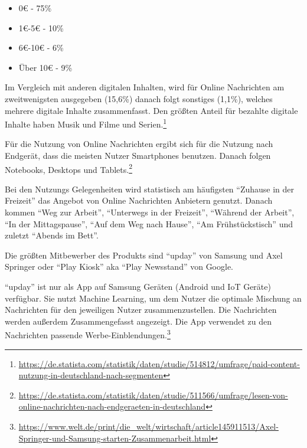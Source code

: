 \begin{itemize}
  \item 0€ - 75\%
  \item 1€-5€ - 10\%
  \item 6€-10€ - 6\%
  \item Über 10€ - 9\%
\end{itemize}

Im Vergleich mit anderen digitalen Inhalten, wird für Online Nachrichten am zweitwenigsten ausgegeben (15,6\%) danach folgt sonstiges (1,1\%), welches mehrere digitale Inhalte zusammenfasst. Den größten Anteil für bezahlte digitale Inhalte haben Musik und Filme und Serien.\footnote{
  \begin{sloppypar}
    \url{https://de.statista.com/statistik/daten/studie/514812/umfrage/paid-content-nutzung-in-deutschland-nach-segmenten}
  \end{sloppypar}
}

Für die Nutzung von Online Nachrichten ergibt sich für die Nutzung nach Endgerät, dass die meisten Nutzer Smartphones benutzen. Danach folgen Notebooks, Desktops und Tablets.\footnote{
  \begin{sloppypar}
    \url{https://de.statista.com/statistik/daten/studie/511566/umfrage/lesen-von-online-nachrichten-nach-endgeraeten-in-deutschland}
  \end{sloppypar}
}

Bei den Nutzungs Gelegenheiten wird statistisch am häufigsten \enquote{Zuhause in der Freizeit} das Angebot von Online Nachrichten Anbietern genutzt. Danach kommen \enquote{Weg zur Arbeit}, \enquote{Unterwegs in der Freizeit}, \enquote{Während der Arbeit}, \enquote{In der Mittagspause}, \enquote{Auf dem Weg nach Hause}, \enquote{Am Frühstückstisch} und zuletzt \enquote{Abends im Bett}.

Die größten Mitbewerber des Produkts sind \enquote{upday} von Samsung und Axel Springer oder \enquote{Play Kiosk} aka \enquote{Play Newsstand} von Google.

\enquote{upday} ist nur als App auf Samsung Geräten (Android und IoT Geräte) verfügbar. Sie nutzt Machine Learning, um dem Nutzer die optimale Mischung an Nachrichten für den jeweiligen Nutzer zusammenzustellen. Die Nachrichten werden außerdem Zusammengefasst angezeigt. Die App verwendet zu den Nachrichten passende Werbe-Einblendungen.\footnote{
  \begin{sloppypar}
    \url{https://www.welt.de/print/die_welt/wirtschaft/article145911513/Axel-Springer-und-Samsung-starten-Zusammenarbeit.html}
  \end{sloppypar}
}

